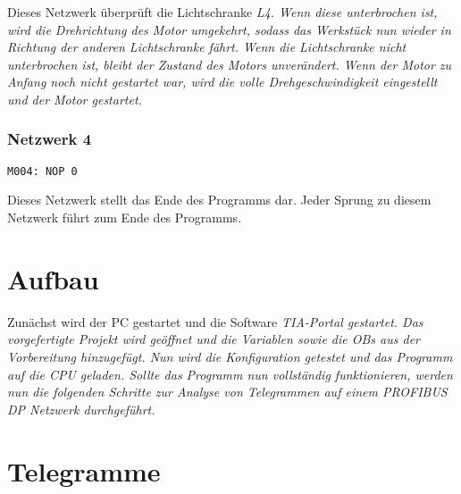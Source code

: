 \documentclass{report}
\begin{document}
Dieses Netzwerk überprüft die Lichtschranke \it{L4}. Wenn diese unterbrochen ist, wird die Drehrichtung des Motor umgekehrt, sodass das Werkstück nun wieder in Richtung der anderen Lichtschranke fährt. Wenn die Lichtschranke nicht unterbrochen ist, bleibt der Zustand des Motors unverändert. Wenn der Motor zu Anfang noch nicht gestartet war, wird die volle Drehgeschwindigkeit eingestellt und der Motor gestartet.
\subsubsection{Netzwerk 4}

\begin{lstlisting}
M004: NOP 0
\end{lstlisting}
Dieses Netzwerk stellt das Ende des Programms dar. Jeder Sprung zu diesem Netzwerk führt zum Ende des Programms.

\section{Aufbau}

Zunächst wird der PC gestartet und die Software \it{TIA-Portal} gestartet. Das vorgefertigte Projekt wird geöffnet und die Variablen sowie die OBs aus der Vorbereitung hinzugefügt. Nun wird die Konfiguration getestet und das Programm auf die CPU geladen.
Sollte das Programm nun vollständig funktionieren, werden nun die folgenden Schritte zur Analyse von Telegrammen auf einem PROFIBUS DP Netzwerk durchgeführt.


\section{Telegramme}
\end{document}
